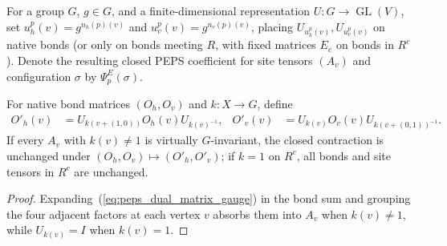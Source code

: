 \begin{definition}%
    \label{def:peps_dual_flux_matrices}
    \leanok
    For a group $G$, $g\in G$, and a finite-dimensional representation
    $U:G\to\operatorname{GL}(V)$, set $u_h^p(v)=g^{n_h(p)(v)}$ and
    $u_v^p(v)=g^{n_v(p)(v)}$, placing $U_{u_h^p(v)},U_{u_v^p(v)}$ on native
    bonds (or only on bonds meeting $R$, with fixed matrices $E_e$ on bonds in
    $R^c$). Denote the resulting closed PEPS coefficient for site tensors
    $(A_v)$ and configuration $\sigma$ by $\Psi_p^E(\sigma)$.
\end{definition}

\begin{lemma}%
    \label{thm:peps_dual_flux_gauge_absorption}
    \leanok
    For native bond matrices $(O_h,O_v)$ and $k:X\to G$, define
    \begin{align}
        O'_h(v) & =U_{k(v+(1,0))}O_h(v)U_{k(v)^{-1}}, &
        O'_v(v) & =U_{k(v)}O_v(v)U_{k(v+(0,1))^{-1}}.
        \label{eq:peps_dual_matrix_gauge}
    \end{align}
    If every $A_v$ with $k(v)\ne1$ is virtually $G$-invariant, the closed
    contraction is unchanged under $(O_h,O_v)\mapsto(O'_h,O'_v)$; if $k=1$ on
    $R^c$, all bonds and site tensors in $R^c$ are unchanged.
\end{lemma}
\begin{proof}\leanok
    Expanding~(\ref{eq:peps_dual_matrix_gauge}) in the bond sum and grouping the
    four adjacent factors at each vertex $v$ absorbs them into $A_v$ when
    $k(v)\ne1$, while $U_{k(v)}=I$ when $k(v)=1$.
\end{proof}

